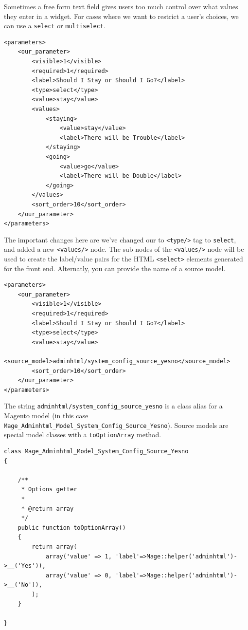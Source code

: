 \documentclass[oneside]{book}
\begin{document}
Sometimes a free form text field gives users too much control over what values they enter in a widget.  For cases where we want to restrict a user's choices, we can use a \footnotesize\texttt{select} \normalsize  or \footnotesize\texttt{multiselect}\normalsize.

\begin{lstlisting}
<parameters>
    <our_parameter>
        <visible>1</visible>
        <required>1</required>
        <label>Should I Stay or Should I Go?</label>
        <type>select</type>
        <value>stay</value>
        <values>
            <staying>
                <value>stay</value>
                <label>There will be Trouble</label>
            </staying>
            <going>
                <value>go</value>
                <label>There will be Double</label>
            </going>
        </values>
        <sort_order>10</sort_order>
    </our_parameter>
</parameters>

\end{lstlisting}


The important changes here are we've changed our to \footnotesize\texttt{\textless type/\textgreater } \normalsize  tag to \footnotesize\texttt{select}\normalsize, and added a new \footnotesize\texttt{\textless values/\textgreater } \normalsize  node.  The sub-nodes of the \footnotesize\texttt{\textless values/\textgreater } \normalsize  node will be used to create the label/value pairs for the HTML \footnotesize\texttt{\textless select\textgreater } \normalsize  elements generated for the front end.  Alternatly, you can provide the name of a source model.

\begin{lstlisting}
<parameters>
    <our_parameter>
        <visible>1</visible>
        <required>1</required>
        <label>Should I Stay or Should I Go?</label>
        <type>select</type>
        <value>stay</value>
        <source_model>adminhtml/system_config_source_yesno</source_model>
        <sort_order>10</sort_order>
    </our_parameter>
</parameters>

\end{lstlisting}


The string \footnotesize\texttt{adminhtml/system\_config\_source\_yesno} \normalsize  is a class alias for a Magento model (in this case \footnotesize\texttt{Mage\_Adminhtml\_Model\_System\_Config\_Source\_Yesno}\normalsize). Source models are special model classes with a \footnotesize\texttt{toOptionArray} \normalsize  method.

\begin{lstlisting}
class Mage_Adminhtml_Model_System_Config_Source_Yesno
{

    /**
     * Options getter
     *
     * @return array
     */
    public function toOptionArray()
    {
        return array(
            array('value' => 1, 'label'=>Mage::helper('adminhtml')->__('Yes')),
            array('value' => 0, 'label'=>Mage::helper('adminhtml')->__('No')),
        );
    }

}

\end{lstlisting}
\end{document}
